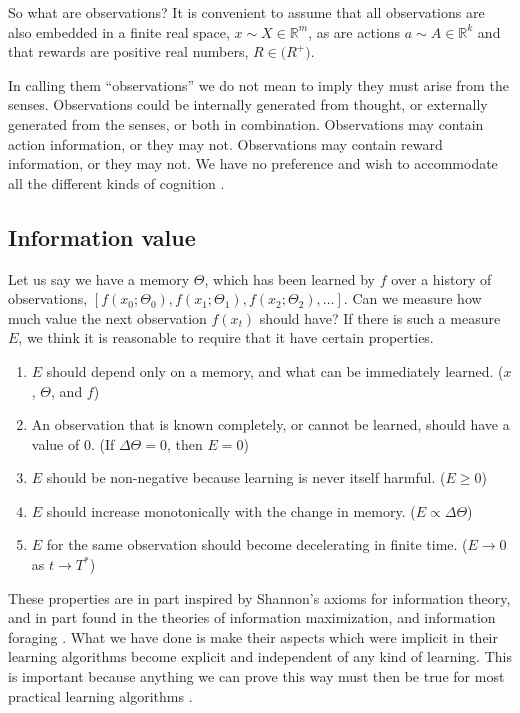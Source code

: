 So what are observations? It is convenient to assume that all observations are also embedded in a finite real space, $x \sim X \in \mathbb{R}^m$, as are actions $a \sim A \in \mathbb{R}^k$ and that rewards are positive real numbers, $R \in \mathbb(R^{+})$. 

In calling them ``observations'' we do not mean to imply they must arise from the senses. Observations could be internally generated from thought, or externally generated from the senses, or both in combination. Observations may contain action information, or they may not. Observations may contain reward information, or they may not. We have no preference and wish to accommodate all the different kinds of cognition \cite{needed}. %

\subsection{Information value} 
Let us say we have a memory $\Theta$, which has been learned by $f$ over a history of observations, $[f(x_0; \Theta_0), f(x_1; \Theta_1), f(x_2; \Theta_2), \ldots]$. Can we measure how much value the next observation $f(x_t)$ should have? If there is such a measure $E$, we think it is reasonable to require that it have certain properties.

\begin{enumerate}
	\item $E$ should depend only on a memory, and what can be immediately learned. ($x$, $\Theta$, and $f$)
	\item An observation that is known completely, or cannot be learned, should have a value of 0. (If $\Delta \Theta = 0$, then $E=0$)
	\item $E$ should be non-negative because learning is never itself harmful. ($E \ge 0$)
	\item $E$ should increase monotonically with the change in memory. ($E \propto \Delta \Theta$)
	\item $E$ for the same observation should become decelerating in finite time. ($E \rightarrow 0$ as $t \rightarrow T^*$)
\end{enumerate}

These properties are in part inspired by Shannon's axioms for information theory, and in part found in the theories of information maximization, and information foraging \cite{needed}. What we have done is make their aspects which were implicit in their learning algorithms become explicit and independent of any kind of learning. This is important because anything we can prove this way must then be true for most practical learning algorithms \cite{MacKay2003}. 

